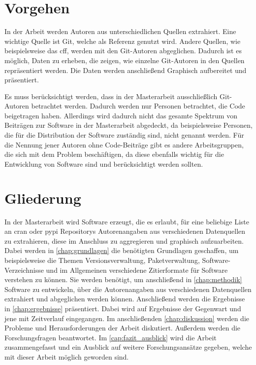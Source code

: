 \section{Vorgehen}
\label{sec:vorgehen}
In der Arbeit werden Autoren aus unterschiedlichen Quellen extrahiert.
Eine wichtige Quelle ist Git, welche als Referenz genutzt wird.
Andere Quellen, wie beispielsweise das \gls{cff}, werden mit den Git-Autoren abgeglichen.
Dadurch ist es möglich, Daten zu erheben, die zeigen, wie einzelne Git-Autoren in den Quellen repräsentiert werden.
Die Daten werden anschließend Graphisch aufbereitet und präsentiert.

Es muss berücksichtigt werden, dass in der Masterarbeit ausschließlich Git-Autoren betrachtet werden.
Dadurch werden nur Personen betrachtet, die Code beigetragen haben.
Allerdings wird dadurch nicht das gesamte Spektrum von Beiträgen zur Software in der Masterarbeit abgedeckt, da beispielsweise Personen, die für die Distribution der Software zuständig sind, nicht genannt werden.
Für die Nennung jener Autoren ohne Code-Beiträge gibt es andere Arbeitsgruppen, die sich mit dem Problem beschäftigen, da diese ebenfalls wichtig für die Entwicklung von Software sind und berücksichtigt werden sollten.

\section{Gliederung}
\label{sec:gliederung}
In der Masterarbeit wird Software erzeugt, die es erlaubt, für eine beliebige Liste an \gls{cran} oder \gls{pypi} Repositorys Autorenangaben aus verschiedenen Datenquellen zu extrahieren, diese im Anschluss zu aggregieren und graphisch aufzuarbeiten.
Dabei werden in \autoref{chap:grundlagen} die benötigten Grundlagen geschaffen, um beispielsweise die Themen Versionsverwaltung, Paketverwaltung, Software-Verzeichnisse und im Allgemeinen verschiedene Zitierformate für Software verstehen zu können.
Sie werden benötigt, um anschließend in \autoref{chap:methodik} Software zu entwickeln, über die Autorenangaben aus verschiedenen Datenquellen extrahiert und abgeglichen werden können.
Anschließend werden die Ergebnisse in \autoref{chap:ergebnisse} präsentiert.
Dabei wird auf Ergebnisse der Gegenwart und jene mit Zeitverlauf eingegangen.
Im anschließenden \autoref{chap:diskussion} werden die Probleme und Herausforderungen der Arbeit diskutiert.
Außerdem werden die Forschungsfragen beantwortet.
Im \autoref{cap:fazit_ausblick} wird die Arbeit zusammengefasst und ein Ausblick auf weitere Forschungsansätze gegeben, welche mit dieser Arbeit möglich geworden sind.
